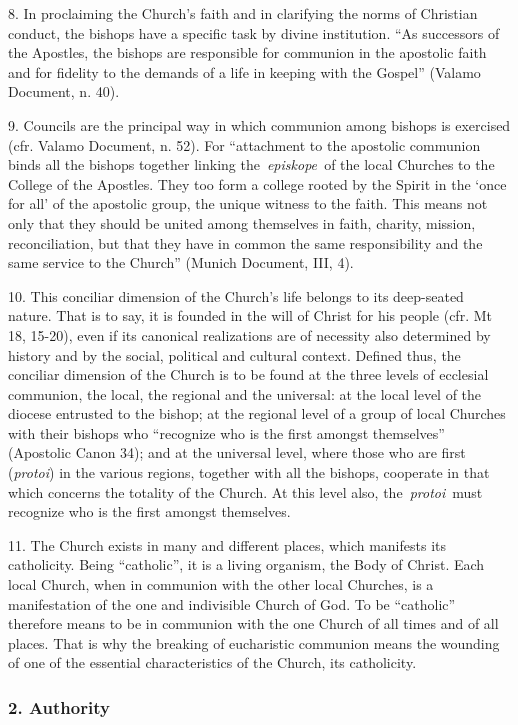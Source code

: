 8. In proclaiming the Church's faith and in clarifying the norms of
Christian conduct, the bishops have a specific task by divine
institution. ``As successors of the Apostles, the bishops are
responsible for communion in the apostolic faith and for fidelity to the
demands of a life in keeping with the Gospel'' (Valamo Document, n. 40).

9. Councils are the principal way in which communion among bishops is
exercised (cfr. Valamo Document, n. 52). For ``attachment to the
apostolic communion binds all the bishops together linking
the~\emph{episkope~}of the local Churches to the College of the
Apostles. They too form a college rooted by the Spirit in the `once for
all' of the apostolic group, the unique witness to the faith. This means
not only that they should be united among themselves in faith, charity,
mission, reconciliation, but that they have in common the same
responsibility and the same service to the Church'' (Munich Document,
III, 4).

10. This conciliar dimension of the Church's life belongs to its
deep-seated nature. That is to say, it is founded in the will of Christ
for his people (cfr. Mt 18, 15-20), even if its canonical realizations
are of necessity also determined by history and by the social, political
and cultural context. Defined thus, the conciliar dimension of the
Church is to be found at the three levels of ecclesial communion, the
local, the regional and the universal: at the local level of the diocese
entrusted to the bishop; at the regional level of a group of local
Churches with their bishops who ``recognize who is the first amongst
themselves'' (Apostolic Canon 34); and at the universal level, where
those who are first (\emph{protoi}) in the various regions, together
with all the bishops, cooperate in that which concerns the totality of
the Church. At this level also, the~\emph{protoi}~must recognize who is
the first amongst themselves.

11. The Church exists in many and different places, which manifests its
catholicity. Being ``catholic'', it is a living organism, the Body of
Christ. Each local Church, when in communion with the other local
Churches, is a manifestation of the one and indivisible Church of God.
To be ``catholic'' therefore means to be in communion with the one
Church of all times and of all places. That is why the breaking of
eucharistic communion means the wounding of one of the essential
characteristics of the Church, its catholicity.

\subsubsection{2. Authority}\label{authority}

